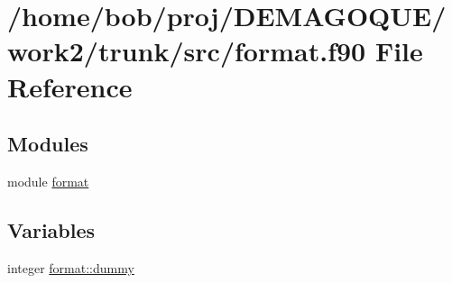 \hypertarget{format_8f90}{
\section{/home/bob/proj/DEMAGOQUE/work2/trunk/src/format.f90 File Reference}
\label{format_8f90}
}
\subsection*{Modules}
\begin{DoxyCompactItemize}
\item 
module \hyperlink{namespaceformat}{format}
\end{DoxyCompactItemize}
\subsection*{Variables}
\begin{DoxyCompactItemize}
\item 
integer \hyperlink{namespaceformat_a35a6cb9f260951fd6bd7ba9144cfaf5e}{format::dummy}
\end{DoxyCompactItemize}
